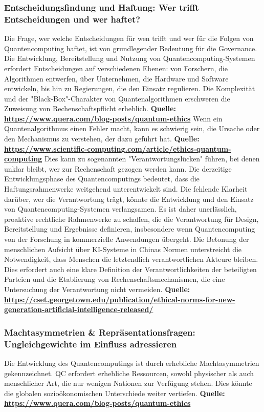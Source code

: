 \subsubsection{Entscheidungsfindung und Haftung: Wer trifft Entscheidungen und wer haftet?}
Die Frage, wer welche Entscheidungen für wen trifft und wer für die Folgen von Quantencomputing haftet, ist von grundlegender Bedeutung für die Governance. Die Entwicklung, Bereitstellung und Nutzung von Quantencomputing-Systemen erfordert Entscheidungen auf verschiedenen Ebenen: von Forschern, die Algorithmen entwerfen, über Unternehmen, die Hardware und Software entwickeln, bis hin zu Regierungen, die den Einsatz regulieren. Die Komplexität und der "Black-Box"-Charakter von Quantenalgorithmen erschweren die Zuweisung von Rechenschaftspflicht erheblich. \textbf{Quelle: \href{https://www.quera.com/blog-posts/quantum-ethics}{https://www.quera.com/blog-posts/quantum-ethics}}
Wenn ein Quantenalgorithmus einen Fehler macht, kann es schwierig sein, die Ursache oder den Mechanismus zu verstehen, der dazu geführt hat. \textbf{Quelle: 
\href{https://www.scientific-computing.com/article/ethics-quantum-computing}{https://www.scientific-computing.com/article/ethics-quantum-computing}}
Dies kann zu sogenannten "Verantwortungslücken" führen, bei denen unklar bleibt, wer zur Rechenschaft gezogen werden kann.
Die derzeitige Entwicklungsphase des Quantencomputings bedeutet, dass die Haftungsrahmenwerke weitgehend unterentwickelt sind. Die fehlende Klarheit darüber, wer die Verantwortung trägt, könnte die Entwicklung und den Einsatz von Quantencomputing-Systemen verlangsamen. Es ist daher unerlässlich, proaktive rechtliche Rahmenwerke zu schaffen, die die Verantwortung für Design, Bereitstellung und Ergebnisse definieren, insbesondere wenn Quantencomputing von der Forschung in kommerzielle Anwendungen übergeht. Die Betonung der menschlichen Aufsicht über KI-Systeme in Chinas Normen unterstreicht die Notwendigkeit, dass Menschen die letztendlich verantwortlichen Akteure bleiben. Dies erfordert auch eine klare Definition der Verantwortlichkeiten der beteiligten Parteien und die Etablierung von Rechenschaftsmechanismen, die eine Untersuchung der Verantwortung nicht vermeiden. 
\textbf{Quelle: \href{https://cset.georgetown.edu/publication/ethical-norms-for-new-generation-artificial-intelligence-released/}{https://cset.georgetown.edu/publication/ethical-norms-for-new-generation-artificial-intelligence-released/}}

\subsubsection{Machtasymmetrien & Repräsentationsfragen: Ungleichgewichte im Einfluss adressieren}
Die Entwicklung des Quantencomputings ist durch erhebliche Machtasymmetrien gekennzeichnet. QC erfordert erhebliche Ressourcen, sowohl physischer als auch menschlicher Art, die nur wenigen Nationen zur Verfügung stehen. Dies könnte die globalen sozioökonomischen Unterschiede weiter vertiefen. 
\textbf{Quelle: \href{https://www.quera.com/blog-posts/quantum-ethics}{https://www.quera.com/blog-posts/quantum-ethics}}

